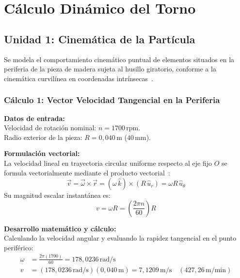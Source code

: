 \documentclass[12pt,a4paper]{article}
\begin{document}
\section{Cálculo Dinámico del Torno}
\label{sec:calculos_dinamicos}

\subsection{Unidad 1: Cinemática de la Partícula}
Se modela el comportamiento cinemático puntual de elementos situados en la periferia de la pieza de madera sujeta al husillo giratorio, conforme a la cinemática curvilínea en coordenadas intrínsecas~\cite{guia_dinamica, hibbeler2016}.

\subsubsection{Cálculo 1: Vector Velocidad Tangencial en la Periferia}

\noindent\textbf{Datos de entrada:}\\
Velocidad de rotación nominal: $n = 1700\,\text{rpm}$.\\
Radio exterior de la pieza: $R = 0{,}040\,\text{m}$ ($40\,\text{mm}$).
\vspace{6pt}

\noindent\textbf{Formulación vectorial:}\\
La velocidad lineal en trayectoria circular uniforme respecto al eje fijo $O$ se formula vectorialmente mediante el producto vectorial~\cite{hibbeler2016}:
\begin{equation}
    \vec{v} = \vec{\omega} \times \vec{r} = (\omega\,\hat{k}) \times (R\,\hat{u}_r) = \omega R\,\hat{u}_\theta
\end{equation}
Su magnitud escalar instantánea es:
\begin{equation}
    v = \omega R = \left(\frac{2\pi n}{60}\right) R
\end{equation}
\vspace{6pt}

\noindent\textbf{Desarrollo matemático y cálculo:}\\
Calculando la velocidad angular y evaluando la rapidez tangencial en el punto periférico:
\begin{align}
    \omega &= \frac{2\pi (1700)}{60} = 178{,}0236\,\text{rad/s} \\[6pt]
    v &= (178{,}0236\,\text{rad/s})(0{,}040\,\text{m}) = \boxed{7{,}1209\,\text{m/s}} \quad (427{,}26\,\text{m/min})
\end{align}
\vspace{6pt}
\end{document}
